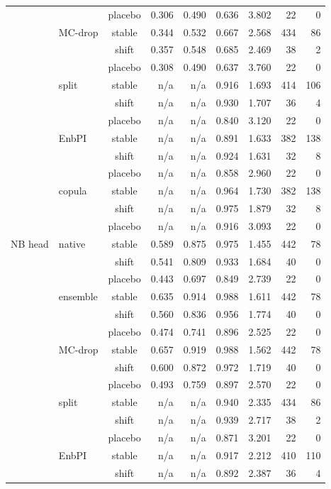 {\begin{longtable}{@{}llcrrrrrr@{}}
 &  & placebo & 0.306 & 0.490 & 0.636 & 3.802 & 22 & 0 \\
 & MC-drop & stable & 0.344 & 0.532 & 0.667 & 2.568 & 434 & 86 \\
 &  & shift & 0.357 & 0.548 & 0.685 & 2.469 & 38 & 2 \\
 &  & placebo & 0.308 & 0.490 & 0.637 & 3.760 & 22 & 0 \\
 & split & stable & n/a & n/a & 0.916 & 1.693 & 414 & 106 \\
 &  & shift & n/a & n/a & 0.930 & 1.707 & 36 & 4 \\
 &  & placebo & n/a & n/a & 0.840 & 3.120 & 22 & 0 \\
 & EnbPI & stable & n/a & n/a & 0.891 & 1.633 & 382 & 138 \\
 &  & shift & n/a & n/a & 0.924 & 1.631 & 32 & 8 \\
 &  & placebo & n/a & n/a & 0.858 & 2.960 & 22 & 0 \\
 & copula & stable & n/a & n/a & 0.964 & 1.730 & 382 & 138 \\
 &  & shift & n/a & n/a & 0.975 & 1.879 & 32 & 8 \\
 &  & placebo & n/a & n/a & 0.916 & 3.093 & 22 & 0 \\
\addlinespace[2pt]
NB head & native & stable & 0.589 & 0.875 & 0.975 & 1.455 & 442 & 78 \\
 &  & shift & 0.541 & 0.809 & 0.933 & 1.684 & 40 & 0 \\
 &  & placebo & 0.443 & 0.697 & 0.849 & 2.739 & 22 & 0 \\
 & ensemble & stable & 0.635 & 0.914 & 0.988 & 1.611 & 442 & 78 \\
 &  & shift & 0.560 & 0.836 & 0.956 & 1.774 & 40 & 0 \\
 &  & placebo & 0.474 & 0.741 & 0.896 & 2.525 & 22 & 0 \\
 & MC-drop & stable & 0.657 & 0.919 & 0.988 & 1.562 & 442 & 78 \\
 &  & shift & 0.600 & 0.872 & 0.972 & 1.719 & 40 & 0 \\
 &  & placebo & 0.493 & 0.759 & 0.897 & 2.570 & 22 & 0 \\
 & split & stable & n/a & n/a & 0.940 & 2.335 & 434 & 86 \\
 &  & shift & n/a & n/a & 0.939 & 2.717 & 38 & 2 \\
 &  & placebo & n/a & n/a & 0.871 & 3.201 & 22 & 0 \\
 & EnbPI & stable & n/a & n/a & 0.917 & 2.212 & 410 & 110 \\
 &  & shift & n/a & n/a & 0.892 & 2.387 & 36 & 4 \\

\end{longtable}}
